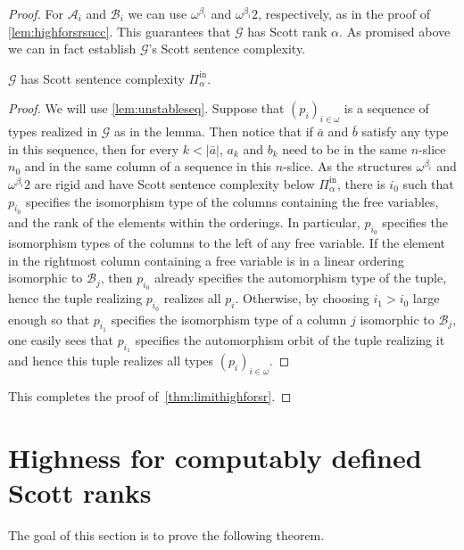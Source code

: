 \documentclass[10pt,a4paper]{amsart}
\newcommand\+[1]{\mathcal{#1}}
\renewcommand\*[1]{\mathbf{#1}}
\renewcommand\=[1]{\text{#1}}
\renewcommand\*[1]{\mathbf{#1}}
\newcommand{\Pinf}[1]{\Pi^{\mathrm{in}}_{#1}}
\newcommand{\nat}{\omega}
\begin{document}
\begin{proof}
   For $\+A_i$ and $\+B_i$ we can use $\omega^{\beta_i}$ and $\omega^{\beta_i}2$, respectively, as in the proof of \cref{lem:highforsrsucc}.
   This guarantees that $\+G$ has Scott rank $\alpha$. As promised above we can in fact establish $\+G$'s Scott sentence complexity.
     \begin{claim} $\+G$ has Scott sentence complexity $\Pinf{\alpha}$.\end{claim}
     \begin{proof}
       We will use \cref{lem:unstableseq}. Suppose that $(p_i)_{i\in\nat}$ is a sequence of types realized in $\+G$ as in the lemma. Then notice that if $\bar a$ and $\bar b$ satisfy any type in this sequence, then for every $k<|\bar a|$, $a_k$ and $b_k$ need to be in the same $n$-slice $n_0$ and in the same column of a sequence in this $n$-slice. As the structures $\omega^{\beta_i}$ and $\omega^{\beta_i}2$ are rigid and have Scott sentence complexity below $\Pinf{\alpha}$, there is $i_0$ such that $p_{i_0}$ specifies the isomorphism type of the columns containing the free variables, and the rank of the elements within the orderings. In particular, $p_{i_0}$ specifies the isomorphism types of the columns to the left of any free variable. If the element in the rightmost column containing a free variable is in a linear ordering isomorphic to $\+B_j$, then $p_{i_0}$ already specifies the automorphism type of the tuple, hence the tuple realizing $p_{i_0}$ realizes all $p_i$. Otherwise, by choosing $i_1>i_0$ large enough so that $p_{i_1}$ specifies the isomorphism type of a column $j$ isomorphic to $\+B_j$, one easily sees that $p_{i_1}$ specifies the automorphism orbit of the tuple realizing it and hence this tuple realizes all types $(p_i)_{i\in\nat}$.
     \end{proof}
     This completes the proof of~\cref{thm:limithighforsr}.
 \end{proof}
 
 \section{Highness for computably defined Scott ranks}\label{sec:cdSr}
 The goal of this section is to prove the following theorem.
 
\end{document}
